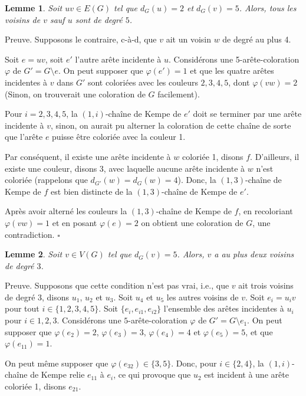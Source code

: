 \documentclass[10pt,a4paper]{article}
\newtheorem{lemme}{Lemme}
\newcommand{\ep}{{\hfill $\square$}}
\begin{document}
\begin{lemme}
Soit $uv \in E(G)$ tel que $d_G(u) = 2$ et $d_G(v) = 5$. Alors, tous les voisins de $v$ sauf $u$ sont de degré $5$. 
\label{le:254}
\end{lemme}

Preuve. 
Supposons le contraire, c-à-d, que $v$ ait un voisin $w$ de degré au plus 4.

Soit $e=uv$, soit $e'$ l'autre arête incidente à $u$.
Considérons une 5-arête-coloration $\varphi$ de $G'=G \setminus e$. On peut supposer que $\varphi(e')=1$ et que les quatre arêtes incidentes à $v$ dans $G'$ sont coloriées avec les couleurs $2,3,4,5$, dont $\varphi(vw)=2$ (Sinon, on trouverait une coloration de $G$ facilement).

Pour $i=2,3,4,5$, la $(1,i)$-chaîne de Kempe de $e'$ doit se terminer par une arête incidente à $v$, sinon, on aurait pu alterner la coloration de cette chaîne de sorte que l'arête $e$ puisse être coloriée avec la couleur 1. 

Par conséquent, il existe une arête incidente à $w$ coloriée 1, disons $f$. D'ailleurs, il existe une couleur, disons 3, avec laquelle aucune arête incidente à $w$ n'est coloriée (rappelons que $d_{G'}(w)=d_G(w)=4$). Donc, la $(1,3)$-chaîne de Kempe de $f$ est bien distincte de la $(1,3)$-chaîne de Kempe de $e'$.

Après avoir alterné les couleurs la $(1,3)$-chaîne de Kempe de $f$, en recoloriant $\varphi(vw)=1$ et en posant $\varphi(e)=2$ on obtient une coloration de $G$, une contradiction. \ep

\begin{lemme}
Soit $v \in V(G)$ tel que $d_G(v) = 5$. Alors, $v$ a au plus deux voisins de degré $3$.
\label{le:5333}
\end{lemme}


Preuve.
Supposons que cette condition n'est pas vrai, i.e., que $v$ ait trois voisins de degré 3, disons $u_1$, $u_2$ et $u_3$. Soit $u_4$ et $u_5$ les autres voisins de $v$. Soit $e_i = u_iv$ pour tout $i \in \{1,2,3,4,5\}$. Soit $\{e_i, e_{i1}, e_{i2}\}$ l'ensemble des arêtes incidentes à $u_i$ pour $i \in {1,2,3}$. Considérons une $5$-arête-coloration $\varphi$ de $G' = G \setminus e_1$. On peut supposer que $\varphi(e_2)=2$, $\varphi(e_3)=3$, $\varphi(e_4)=4$ et $\varphi(e_5)=5$, et que $\varphi(e_{11}) = 1$. 

On peut même supposer que $\varphi(e_{32}) \in \{3,5\}$.
Donc, pour $i \in \{2,4\}$, la $(1,i)$-chaîne de Kempe relie $e_{11}$ à $e_i$, ce qui provoque que $u_2$ est incident à une arête coloriée 1, disons $e_{21}$. 
\end{document}
